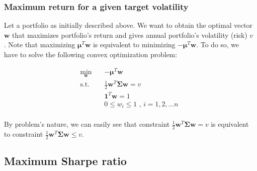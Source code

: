 \documentclass{beamer}
\begin{document}
\begin{frame}
\frametitle{\textbf{Maximum return for a given target volatility}}

\justifying
Let a portfolio as initially described above. We want to obtain the optimal vector $\mathbf{w}$ that maximizes portfolio's return and gives annual portfolio's volatility (risk) $v$. Note that maximizing $\boldsymbol\mu^{T} \mathbf{w}$ is equivalent to minimizing $- \boldsymbol\mu^{T} \mathbf{w}$. To do so, we have to solve the following convex optimization problem:

\vspace{0.2cm}
\justifying
\begin{equation}
\begin{aligned}
\label{eq:3}
\min_{\mathbf{w}} \quad & - \boldsymbol\mu^{T} \mathbf{w} \\
\textrm{s.t.} \quad & \frac{1}{2}\mathbf{w}^{T}\mathbf{\Sigma}\mathbf{w} = v \\
                             & \mathbf{1}^{T} \mathbf{w} = 1 \\
                             & 0 \leq w_{i} \leq 1 \textrm{ , } i = 1, 2, \dots n \\
\end{aligned}
\end{equation}

\vspace{0.2cm}
\justifying
By problem's nature, we can easily see that constraint $\frac{1}{2}\mathbf{w}^{T}\mathbf{\Sigma}\mathbf{w} = v$ is equivalent to constraint $\frac{1}{2}\mathbf{w}^{T}\mathbf{\Sigma}\mathbf{w} \leq v$.

\end{frame}






\subsection{Maximum Sharpe ratio}
\end{document}
